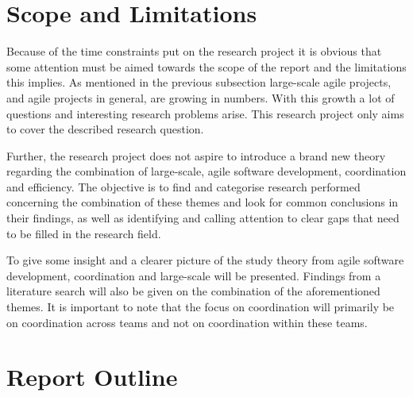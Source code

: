 \section{Scope and Limitations}


Because of the time constraints put on the research project it is obvious that some attention must be aimed towards the scope of the report and the limitations this implies. As mentioned in the previous subsection large-scale agile projects, and agile projects in general, are growing in numbers. With this growth a lot of questions and interesting research problems arise. This research project only aims to cover the described research question.

Further, the research project does not aspire to introduce a brand new theory regarding the combination of large-scale, agile software development, coordination and efficiency. The objective is to find and categorise research performed concerning the combination of these themes and look for common conclusions in their findings, as well as identifying and calling attention to clear gaps that need to be filled in the research field.

To give some insight and a clearer picture of the study theory from agile software development, coordination and large-scale will be presented. Findings from a literature search will also be given on the combination of the aforementioned themes. It is important to note that the focus on coordination will primarily be on coordination across teams and not on coordination within these teams.

\section{Report Outline}